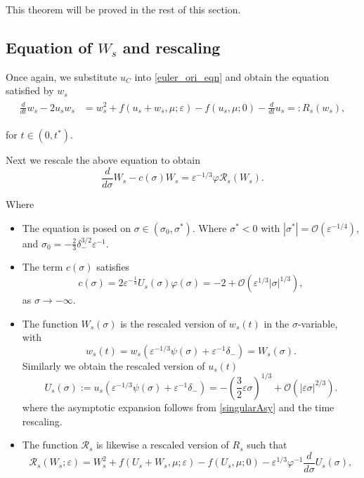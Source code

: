 \documentclass[letterpaper,11pt]{article}
\newcommand{\rmO}{\mathcal{O}}
\newcommand{\eps}{\varepsilon}
\newcommand{\Ral}{\mathcal{R}}
\numberwithin{equation}{section}
\theoremstyle{plain}
\begin{document}
This theorem will be proved in the rest of this section.

\subsection{Equation of \texorpdfstring{$W_{s}$}{Ws} and rescaling }

Once again, we substitute $u_C$ into \eqref{euler_ori_eqn} and obtain the equation satisfied by $w_s$
\begin{align}\label{Eqn_ws}
\begin{split}
\frac{d}{dt} w_{s} -2u_sw_s &=   w_s^2 + f(u_s+w_s, \mu; \eps)-f(u_s, \mu; 0) - \frac{d}{dt}u_s =: R_s(w_s),
\end{split}
\end{align}

for $t\in (0, t^*)$.

Next we rescale the above equation to obtain
\begin{equation}
\frac{d}{d\sigma} W_s - c(\sigma)W_s = \eps^{-1/3}\varphi \Ral_s(W_s).
\end{equation}

Where 
\begin{itemize}

\item The equation is posed on $\sigma \in \left(\sigma_0, \sigma^*\right).$ Where $\sigma^*<0$ with $|\sigma^*| = \rmO(\eps^{-1/4})$, and $\sigma_0  =-\frac{2}{3}\delta_-^{3/2}\eps^{-1}$.

\item The term $c(\sigma)$ satisfies
\[
c(\sigma) = 2\eps^{-\frac{1}{3}}U_s(\sigma)\varphi(\sigma) = -2 + \rmO(\eps^{1/3}|\sigma|^{1/3}),
\]
as $\sigma \to -\infty$.

\item The function $W_s(\sigma)$ is the rescaled version of $w_s(t)$ in the $\sigma$-variable, with 
\[
w_s(t) = w_s(\eps^{-1/3}\psi(\sigma)+\eps^{-1}\delta_-) = W_s(\sigma). 
\]
Similarly we obtain the rescaled version of $u_s(t)$
\begin{equation}\label{sing_exp}
U_s(\sigma) :=u_s(\eps^{-1/3}\psi(\sigma)+\eps^{-1}\delta_-)= -\left(\frac{3}{2}\eps \sigma\right)^{1/3} + \rmO(|\eps \sigma|^{2/3} ).
\end{equation}
where the asymptotic expansion follows from \eqref{singularAsy} and the time rescaling.
\item The function $\Ral_s$ is likewise a rescaled version of $R_s$ such that 
\[
\Ral_s(W_s;\eps) = W_s^2+ f(U_s+W_s, \mu ; \eps)-f(U_s,\mu;0)- \eps^{1/3}\varphi^{-1} \frac{d}{d\sigma}U_s(\sigma),
\] 


\end{itemize}
 
\end{document}
